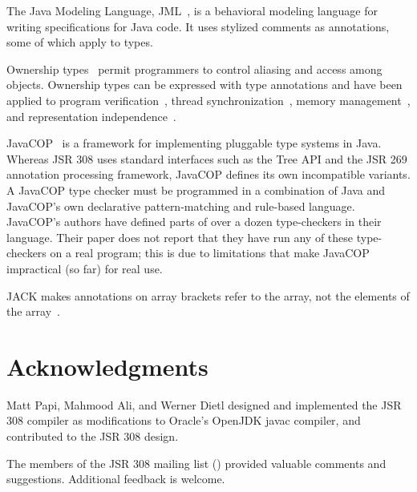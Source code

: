 \documentclass[10pt]{article}
\begin{document}
The Java Modeling Language, JML~\cite{LeavensBR2006:JML}, is a behavioral
modeling language for writing specifications for Java code.  It uses
stylized comments as annotations, some of which apply to types.


Ownership types~\cite{ClarkePN98,Boyapati2004:PhD,Clark2001,ClarkD2002,PotaninNCB2006,NobleVP98,DietlM2005,LeinoM2004,YuP2006}
permit programmers to control aliasing and access among objects.  Ownership
types can be expressed with type annotations
and have been applied to program
verification~\cite{LeinoM2004,Muller2002,MullerPHL2006}, thread
synchronization~\cite{BoyapatiLR2002,JacobsPLS2005}, memory
management~\cite{AndreaCGNVZ2006,BoyapatiSBR2003}, and representation
independence~\cite{BanerjeeN2002}.


JavaCOP~\cite{AndreaeNMM2006} is a framework for implementing pluggable
type systems in Java.  Whereas JSR 308 uses standard
interfaces such as the Tree API and the JSR 269 annotation processing
framework, JavaCOP defines its own incompatible variants.
A JavaCOP type checker must be programmed in a combination of Java and
JavaCOP's own declarative pattern-matching and rule-based language.
JavaCOP's authors have defined parts of over a dozen
type-checkers in their language.  Their paper does not report that they have
run any of these type-checkers on a real program; this is due to
limitations that make JavaCOP impractical (so far) for real use.


JACK makes annotations on array brackets refer to the array, not the
elements of the array~\cite{MalePPD2008}.


\section*{Acknowledgments}

Matt Papi, Mahmood Ali, and Werner Dietl designed and implemented the JSR 308 compiler as
modifications to Oracle's OpenJDK javac compiler, and contributed to the JSR
308 design.

The members of the JSR 308 mailing list
() provided
valuable comments and suggestions.
%
Additional feedback is welcome.
\end{document}
